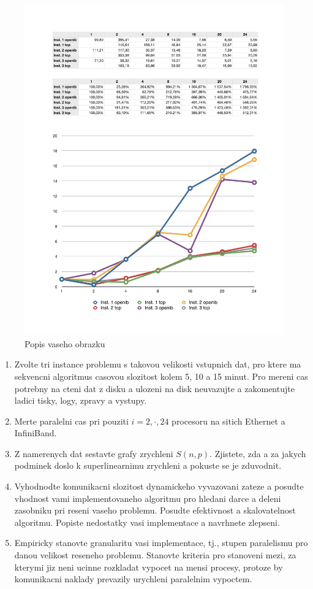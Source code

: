 \documentclass[a4paper]{article}
\begin{document}
\begin{figure}[ht]
\centerline{\includegraphics[width=\textwidth]{graph.pdf}}
\caption{Popis vaseho obrazku}
\label{labelvasehoobrazku}
\end{figure}

\begin{enumerate}
\item Zvolte tri instance problemu s takovou velikosti vstupnich dat, pro ktere ma sekvencni 
algoritmus casovou slozitost kolem 5, 10 a 15 minut.
Pro mereni cas potrebny na cteni dat z disku a ulozeni na disk neuvazujte a zakomentujte
ladici tisky, logy, zpravy a vystupy.
\item Merte paralelni cas pri pouziti $i=2,\cdot,24$ procesoru na sitich Ethernet a InfiniBand.
\item Z namerenych dat sestavte grafy zrychleni $S(n,p)$. Zjistete, zda a za jakych podminek
doslo k superlinearnimu zrychleni a pokuste se je zduvodnit.
\item Vyhodnodte komunikacni slozitost dynamickeho vyvazovani zateze a posudte
vhodnost vami implementovaneho algoritmu pro hledani darce a deleni zasobniku pri reseni vaseho
problemu. Posudte efektivnost a skalovatelnost algoritmu. Popiste nedostatky
vasi implementace a navrhnete zlepseni.
\item Empiricky stanovte 
granularitu vasi implementace, tj., stupen paralelismu pro danou velikost reseneho
problemu. Stanovte kriteria pro stanoveni mezi, za kterymi jiz neni
ucinne rozkladat vypocet na mensi procesy, protoze by komunikacni
naklady prevazily urychleni paralelnim vypoctem.

\end{enumerate}
\end{document}
